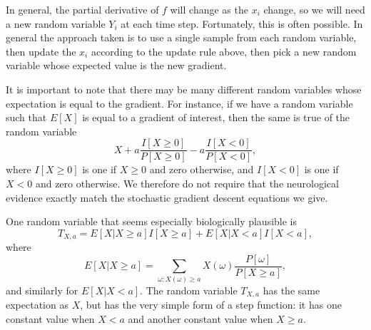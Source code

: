 \documentclass{article}
\theoremstyle{definition}
\begin{document}
In general, the partial derivative of $f$ will change as the $x_i$
change, so we will need a new random variable $Y_i$ at each time
step. Fortunately, this is often possible. In general the approach
taken is to use a single sample from each random variable, then update
the $x_i$ according to the update rule above, then pick a new random
variable whose expected value is the new gradient.

It is important to note that there may be many different random
variables whose expectation is equal to the gradient. For instance, if
we have a random variable such that $E[X]$ is equal to a gradient of
interest, then the same is true of the random variable
$$X + a\frac{I[X \ge 0]}{P[X \ge 0]} - a \frac{I[X<0]}{P[X < 0]},$$
where $I[X \ge 0]$ is one if $X \ge 0$ and zero otherwise, and
$I[X<0]$ is one if $X<0$ and zero otherwise. We therefore do not
require that the neurological evidence exactly match the stochastic
gradient descent equations we give.

One random variable that seems especially biologically plausible is
$$T_{X, a} = E[X | X\ge a] I[X \ge a] + E[X | X < a] I[X < a],$$
where
$$E[X | X \ge a] = \sum_{\omega: X(\omega) \ge a}X(\omega)
\frac{P[\omega]}{P[X \ge a]},$$ 
and similarly for $E[X | X < a]$. The random variable $T_{X,a}$ has
the same expectation as $X$, but has the very simple form of a step
function: it has one constant value when $X<a$ and another constant
value when $X\ge a$.
\end{document}

